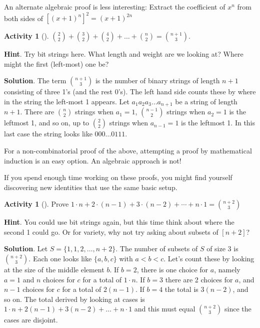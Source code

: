 \documentclass[10pt,]{book}
\theoremstyle{plain}
\theoremstyle{definition}
\theoremstyle{definition}
\theoremstyle{definition}
\newtheorem{activity}[project]{Activity}
\numberwithin{equation}{chapter}
\newcommand{\lt}{<}
\begin{document}
\hypertarget{p-713}{}%
An alternate algebraic proof is less interesting: Extract the coefficient of \(x^{n}\) from both sides of \(\left\lbrack \left( x + 1 \right)^{n} \right\rbrack^{2} = \left(x + 1 \right)^{2n}\)%
\begin{activity}[]\label{activity-95}
\hypertarget{p-714}{}%
\(\binom{2}{2} + \binom{3}{2} + \binom{4}{2} + \ldots + \binom{n}{2} = \binom{n + 1}{3}\).%
\par\smallskip%
\noindent\textbf{Hint}.\hypertarget{hint-56}{}\quad%
\hypertarget{p-715}{}%
Try bit strings here.  What length and weight are we looking at?  Where might the first (left-most) one be?%
\par\smallskip%
\noindent\textbf{Solution}.\hypertarget{solution-50}{}\quad%
\hypertarget{p-716}{}%
The term \(\binom{n + 1}{3}\) is the number of binary strings of length \(n + 1\) consisting of three 1's (and the rest 0's). The left hand side counts these by where in the string the left-most 1 appears. Let \(a_{1}a_{2}a_{3}\ldots a_{n + 1}\) be a string of length \(n + 1\). There are \(\binom{n}{2}\) strings when \(a_{1} = 1\), \(\binom{n - 1}{2}\) strings when \(a_{2} = 1\) is the leftmost 1, and so on, up to \(\binom{2}{2}\) strings when \(a_{n - 1} = 1\) is the leftmost 1. In this last case the string looks like \(000\ldots 0111\).%
\end{activity}
\hypertarget{p-717}{}%
For a non-combinatorial proof of the above, attempting a proof by mathematical induction is an easy option. An algebraic approach is not!%
\par
\hypertarget{p-718}{}%
If you spend enough time working on these proofs, you might find yourself discovering new identities that use the same basic setup.%
\begin{activity}[]\label{activity-96}
\hypertarget{p-719}{}%
Prove \(1\cdot n + 2 \cdot (n-1) + 3 \cdot (n-2) + \cdots + n \cdot 1 = \binom{n+2}{3}\)%
\par\smallskip%
\noindent\textbf{Hint}.\hypertarget{hint-57}{}\quad%
\hypertarget{p-720}{}%
You could use bit strings again, but this time think about where the second 1 could go.  Or for variety, why not try asking about subsets of \([n+2]\)?%
\par\smallskip%
\noindent\textbf{Solution}.\hypertarget{solution-51}{}\quad%
\hypertarget{p-721}{}%
\hypertarget{p-722}{}%
Let \(S = \{1,1,2,\ldots,n + 2\}\). The number of subsets of \(S\) of size 3 is \(\binom{n + 2}{3}\). Each one looks like \(\{a, b, c\}\) with \(a \lt b \lt c\). Let's count these by looking at the size of the middle element \(b\). If \(b=2\), there is one choice for \(a\), namely \(a=1\) and \(n\) choices for \(c\) for a total of \(1 \cdot n\). If \(b=3\) there are 2 choices for \(a\), and \(n - 1\) choices for \(c\) for a total of \(2(n - 1)\). If \(b=4\) the total is \(3(n - 2)\), and so on. The total derived by looking at cases is \(1 \cdot n + 2\left( n - 1 \right) + 3\left( n - 2 \right) + \ldots + n \cdot 1\) and this must equal \(\binom{n + 2}{3}\) since the cases are disjoint.%
%
\end{activity}
\end{document}
